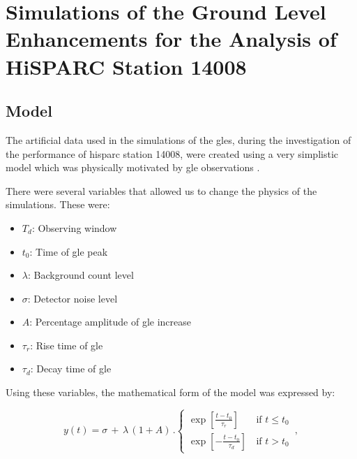 \chapter{Simulations of the Ground Level Enhancements for the Analysis of HiSPARC Station 14008}\label{app:GLE_sims}


\section{Model}

The artificial data used in the simulations of the \glspl{gle}, during the investigation of the performance of \gls{hisparc} station 14008, were created using a very simplistic model which was physically motivated by \gls{gle} observations \citep{strauss_pulse_2017}.

There were several variables that allowed us to change the physics of the simulations. These were:

\begin{itemize}
	\item{{\bf $T_d$}: Observing window}
	\item{{\bf $t_0$}: Time of \gls{gle} peak}
	\item{{\bf $\lambda$}}: Background count level
	\item{{\bf $\sigma$}}: Detector noise level
	\item{{\bf $A$}: Percentage amplitude of \gls{gle} increase}
	\item{{\bf $\tau_r$}: Rise time of \gls{gle}}
	\item{{\bf $\tau_d$}: Decay time of \gls{gle}}
\end{itemize}

Using these variables, the mathematical form of the model was expressed by:

\begin{equation}
    y(t) =  \sigma \, + \, \lambda \, (1 + A) \, . 
\begin{cases}

\exp\left[{\frac{t - t_0}{\tau_r}}\right] \,  & \text{if           $t \leq t_0$} \\

\exp\left[{-\frac{t - t_0}{\tau_d}}\right] \,  & \text{if           $t > t_0$} 

\end{cases} \, ,
\label{eq:GLE_model}
\end{equation}

